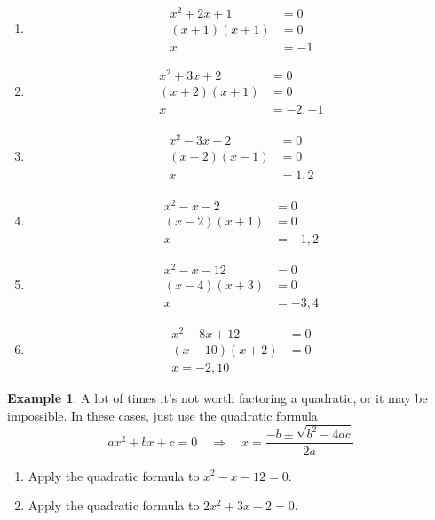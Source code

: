 \documentclass[oneside]{book}
\theoremstyle{definition}
\newtheorem{example}{Example}
\theoremstyle{solution}
\newtheorem*{solution}{Solution}
\newcommand{\handoutfill}{}
\newcommand{\handoutitemsep}{}
\newenvironment{solution}{\vspace{2in}\comment}{\endcomment}
\newcommand{\handoutfill}{\vfill}
\newcommand{\handoutitemsep}{\itemsep=\fill}
\begin{document}
\begin{solution}
\begin{multicols}{2}
\begin{enumerate}
\item \begin{align*}
x^2+2x+1 & =0\\
(x+1)(x+1) & = 0\\
x& = -1
\end{align*}

\item 
\begin{align*}
x^2+3x+2 & = 0\\
(x+2)(x+1) & = 0\\
x & = -2, -1
\end{align*}

\item
\begin{align*}
x^2-3x+2 & = 0\\
(x-2)(x-1) & = 0\\
x & = 1,2
\end{align*}

\item
\begin{align*}
x^2-x-2 & = 0\\
(x-2)(x+1) & =0\\
x & = -1,2
\end{align*}

\item
\begin{align*}
x^2-x-12 & = 0\\
(x-4)(x+3) & = 0\\
x & = -3,4
\end{align*}

\item
\begin{align*}
x^2-8x+12 & = 0\\
(x-10)(x+2) & = 0\\
x=-2,10
\end{align*}
\end{enumerate}
\end{multicols}
\end{solution}



\begin{example}
  A lot of times it's not worth factoring a quadratic, or it may be
  impossible.  In these cases, just use the quadratic formula
$$
ax^2+bx+c = 0 
\quad \Longrightarrow \quad 
x = \frac{-b\pm \sqrt{b^2-4ac}}{2a}
$$
\begin{enumerate}
\handoutitemsep
\item Apply the quadratic formula to $x^2-x-12=0$.
\item Apply the quadratic formula to $2x^2+3x-2=0$.
\handoutfill
\end{enumerate}
\end{example}
\end{document}
